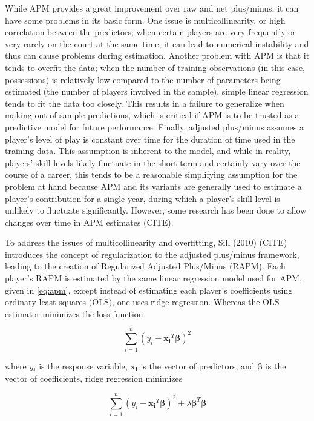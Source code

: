While APM provides a great improvement over raw and net plus/minus, it can have some
problems in its basic form. One issue is multicollinearity, or high correlation
between the predictors; when certain players are very frequently or very rarely on
the court at the same time, it can lead to numerical instability and thus can cause
problems during estimation. Another problem with APM is that it tends to overfit the
data; when the number of training observations (in this case, possessions) is
relatively low compared to the number of parameters being estimated (the number of
players involved in the sample), simple linear regression tends to fit the data too
closely. This results in a failure to generalize when making out-of-sample
predictions, which is critical if APM is to be trusted as a predictive model
for future performance. Finally, adjusted plus/minus assumes a player's level of
play is constant over time for the duration of time used in the training data. This
assumption is inherent to the model, and while in reality, players' skill levels
likely fluctuate in the short-term and certainly vary over the course of a career,
this tends to be a reasonable simplifying assumption for the problem at hand because
APM and its variants are generally used to estimate a player's contribution for a
single year, during which a player's skill level is unlikely to fluctuate
significantly. However, some research has been done to allow changes over time in
APM estimates (CITE).

To address the issues of multicollinearity and overfitting, Sill (2010) (CITE)
introduces the concept of regularization to the adjusted plus/minus framework,
leading to the creation of Regularized Adjusted Plus/Minus (RAPM). Each player’s
RAPM is estimated by the same linear regression model used for APM, given in
\eqref{eq:apm}, except instead of estimating each player’s coefficients using
ordinary least squares (OLS), one uses ridge regression. Whereas the OLS estimator
minimizes the loss function

\begin{equation} \label{eq:ols_loss}
    \sum_{i=1}^n \left( y_i - \bm{x_i}^T\bm{\beta} \right)^2
\end{equation}

where $y_i$ is the response variable, $\bm{x_i}$ is the vector of predictors, and
$\bm{\beta}$ is the vector of coefficients, ridge regression minimizes

\begin{equation} \label{eq:ridge_loss}
    \sum_{i=1}^n \left( y_i - \bm{x_i}^T\bm{\beta} \right)^2 + \lambda
    \bm{\beta}^T\bm{\beta}
\end{equation}

